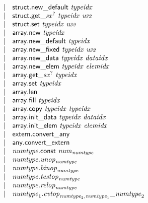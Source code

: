 $$\begin{array}[t]{@{}lrrl@{}l@{}}
& & | & \mathsf{struct{.}new\_default}~{\mathit{typeidx}} \\
& & | & {\mathsf{struct{.}get}}{\mathsf{\_}}{{{\mathit{sx}}^?}}~{\mathit{typeidx}}~{\mathit{u{\kern-0.1em\scriptstyle 32}}} \\
& & | & \mathsf{struct{.}set}~{\mathit{typeidx}}~{\mathit{u{\kern-0.1em\scriptstyle 32}}} \\
& & | & \mathsf{array{.}new}~{\mathit{typeidx}} \\
& & | & \mathsf{array{.}new\_default}~{\mathit{typeidx}} \\
& & | & \mathsf{array{.}new\_fixed}~{\mathit{typeidx}}~{\mathit{u{\kern-0.1em\scriptstyle 32}}} \\
& & | & \mathsf{array{.}new\_data}~{\mathit{typeidx}}~{\mathit{dataidx}} \\
& & | & \mathsf{array{.}new\_elem}~{\mathit{typeidx}}~{\mathit{elemidx}} \\
& & | & {\mathsf{array{.}get}}{\mathsf{\_}}{{{\mathit{sx}}^?}}~{\mathit{typeidx}} \\
& & | & \mathsf{array{.}set}~{\mathit{typeidx}} \\
& & | & \mathsf{array{.}len} \\
& & | & \mathsf{array{.}fill}~{\mathit{typeidx}} \\
& & | & \mathsf{array{.}copy}~{\mathit{typeidx}}~{\mathit{typeidx}} \\
& & | & \mathsf{array{.}init\_data}~{\mathit{typeidx}}~{\mathit{dataidx}} \\
& & | & \mathsf{array{.}init\_elem}~{\mathit{typeidx}}~{\mathit{elemidx}} \\
& & | & \mathsf{extern{.}convert\_any} \\
& & | & \mathsf{any{.}convert\_extern} \\
& & | & {\mathit{numtype}}{.}\mathsf{const}~{{\mathit{num}}}_{{\mathit{numtype}}} \\
& & | & {\mathit{numtype}} {.} {{\mathit{unop}}}_{{\mathit{numtype}}} \\
& & | & {\mathit{numtype}} {.} {{\mathit{binop}}}_{{\mathit{numtype}}} \\
& & | & {\mathit{numtype}} {.} {{\mathit{testop}}}_{{\mathit{numtype}}} \\
& & | & {\mathit{numtype}} {.} {{\mathit{relop}}}_{{\mathit{numtype}}} \\
& & | & {\mathit{numtype}}_1 {.} {{{\mathit{cvtop}}}_{{\mathit{numtype}}_2, {\mathit{numtype}}_1}}{\mathsf{\_}}{{\mathit{numtype}}_2} \\

\end{array}$$
